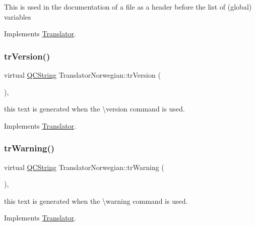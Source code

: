This is used in the documentation of a file as a header before the list of (global) variables 

Implements \mbox{\hyperlink{class_translator}{Translator}}.

\mbox{\label{class_translator_norwegian_a6204fd86995f2396d07f220646d16880}} 
\subsubsection{\texorpdfstring{trVersion()}{trVersion()}}
{\footnotesize\ttfamily virtual \mbox{\hyperlink{class_q_c_string}{Q\+C\+String}} Translator\+Norwegian\+::tr\+Version (\begin{DoxyParamCaption}{ }\end{DoxyParamCaption})\hspace{0.3cm}{\ttfamily [inline]}, {\ttfamily [virtual]}}

this text is generated when the \textbackslash{}version command is used. 

Implements \mbox{\hyperlink{class_translator}{Translator}}.

\mbox{\label{class_translator_norwegian_a321a35ac04917c7cfad58c8b07d96c66}} 
\subsubsection{\texorpdfstring{trWarning()}{trWarning()}}
{\footnotesize\ttfamily virtual \mbox{\hyperlink{class_q_c_string}{Q\+C\+String}} Translator\+Norwegian\+::tr\+Warning (\begin{DoxyParamCaption}{ }\end{DoxyParamCaption})\hspace{0.3cm}{\ttfamily [inline]}, {\ttfamily [virtual]}}

this text is generated when the \textbackslash{}warning command is used. 

Implements \mbox{\hyperlink{class_translator}{Translator}}.

\mbox{\label{class_translator_norwegian_a9a778642085f53f98ef05c1e4b6db7f1}} 
